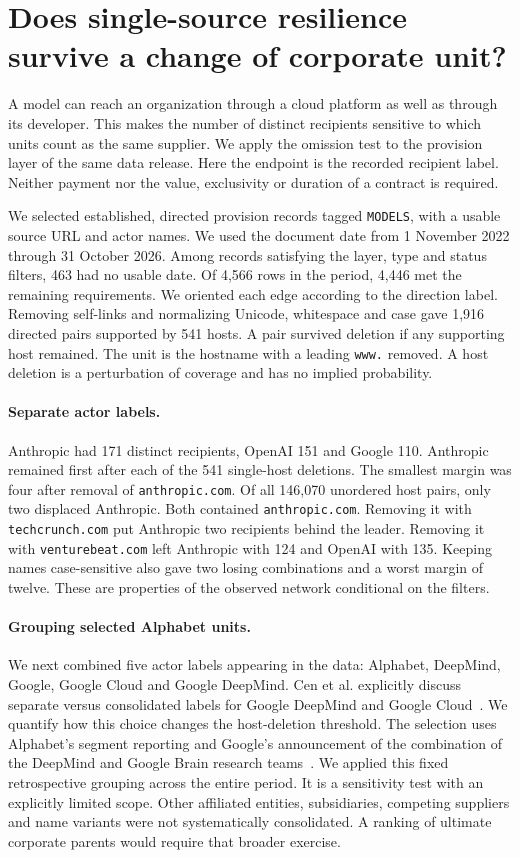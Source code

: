 \section{Does single-source resilience survive a change of corporate unit?}
A model can reach an organization through a cloud platform as well as through its developer. This makes the number of distinct recipients sensitive to which units count as the same supplier. We apply the omission test to the provision layer of the same data release. Here the endpoint is the recorded recipient label. Neither payment nor the value, exclusivity or duration of a contract is required.

We selected established, directed provision records tagged \texttt{MODELS}, with a usable source URL and actor names. We used the document date from 1 November 2022 through 31 October 2026. Among records satisfying the layer, type and status filters, 463 had no usable date. Of 4,566 rows in the period, 4,446 met the remaining requirements. We oriented each edge according to the direction label. Removing self-links and normalizing Unicode, whitespace and case gave 1,916 directed pairs supported by 541 hosts. A pair survived deletion if any supporting host remained. The unit is the hostname with a leading \texttt{www.} removed. A host deletion is a perturbation of coverage and has no implied probability.

\paragraph{Separate actor labels.}
Anthropic had 171 distinct recipients, OpenAI 151 and Google 110. Anthropic remained first after each of the 541 single-host deletions. The smallest margin was four after removal of \texttt{anthropic.com}. Of all 146,070 unordered host pairs, only two displaced Anthropic. Both contained \texttt{anthropic.com}. Removing it with \texttt{techcrunch.com} put Anthropic two recipients behind the leader. Removing it with \texttt{venturebeat.com} left Anthropic with 124 and OpenAI with 135. Keeping names case-sensitive also gave two losing combinations and a worst margin of twelve. These are properties of the observed network conditional on the filters.

\paragraph{Grouping selected Alphabet units.}
We next combined five actor labels appearing in the data: Alphabet, DeepMind, Google, Google Cloud and Google DeepMind. Cen et al. explicitly discuss separate versus consolidated labels for Google DeepMind and Google Cloud~\cite{cen}. We quantify how this choice changes the host-deletion threshold. The selection uses Alphabet's segment reporting and Google's announcement of the combination of the DeepMind and Google Brain research teams~\cite{alphabet,deepmind}. We applied this fixed retrospective grouping across the entire period. It is a sensitivity test with an explicitly limited scope. Other affiliated entities, subsidiaries, competing suppliers and name variants were not systematically consolidated. A ranking of ultimate corporate parents would require that broader exercise.

